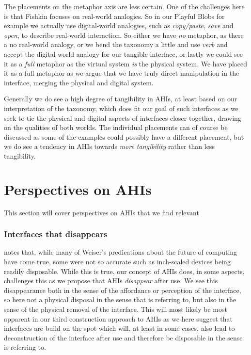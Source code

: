 The placements on the metaphor axis are less certain.
One of the challenges here is that Fishkin focuses on real-world analogies.
So in our Playful Blobs for example we actually use digital-world analogies, such as \emph{copy/paste}, \emph{save} and \emph{open}, to describe real-world interaction.
So either we have \emph{no} metaphor, as there a no real-world analogy, or we bend the taxonomy a little and use \emph{verb} and accept the digital-world analogy for our tangible interface, or lastly we could see it as a \emph{full} metaphor as the virtual system \emph{is} the
physical system. 
We have placed it as a full metaphor as we argue that we have truly direct manipulation in the interface, merging the physical and digital system.

Generally we do see a high degree of tangibility in AHIs, at least based on our interpretation of the taxonomy, which does fit our goal of such interfaces as we seek to tie the physical and digital aspects of interfaces closer together, drawing on the qualities of both worlds.
The individual placements can of course be discussed as some of the examples could possibly have a different placement, but we do see a tendency in AHIs towards \emph{more tangibility} rather than less tangibility. 

\section{Perspectives on AHIs}
This section will cover perspectives on AHIs that we find relevant 

\subsubsection{Interfaces that disappears}
\citet{abowd2012next} notes that, while many of Weiser's predications about the future of computing have come true, some were not so accurate such as inch-scaled devices being readily disposable.
While this is true, our concept of AHIs does, in some aspects, challenges this as we propose that AHIs \emph{disappear} after use.
We see this disappearance both in the sense of the affordance or perception of the interface, so here not a physical disposal in the sense that \citeauthor{abowd2012next} is referring to, but also in the sense of the physical removal of the interface.
This will most likely be most apparent in our third construction approach to AHIs as we here suggest that interfaces are build on the spot which will, at least in some cases, also lead to deconstruction of the interface after use and therefore be disposable in the sense \citeauthor{abowd2012next} is referring to.

